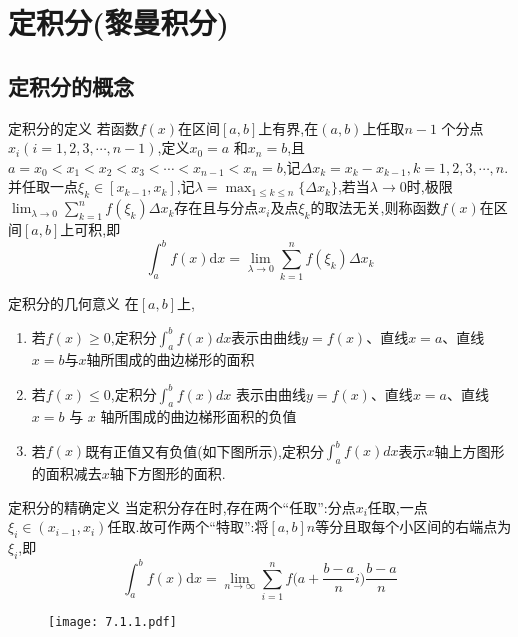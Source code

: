 \documentclass[8pt a4paper, oneside, UTF8]{ctexbook}  %
\begin{document}
\begin{sloppypar}
    \else
    \fi
    \chapter{定积分(黎曼积分)}
    \section{定积分的概念}
    \begin{defn}{定积分的定义}{}
        若函数$f(x)$在区间$[a,b]$上有界,在$(a,b)$上任取$n-1$ 个分点$x_i(i=1,2,3,\cdots,n-1)$,定义$x_0=a$ 和$x_n=b$,且$a=x_0<x_1<x_2<x_3<\cdots<x_{n-1}<x_n=b$,记$\Delta x_k=x_k-x_{k-1},k=1,2,3,\cdots,n$.并任取一点$\xi_{k}\in[x_{k-1},x_{k}]$,记$\lambda=\max_{1\leq k \leq n}\{\Delta x_{k}\}$,若当$\lambda\to0$时,极限$\lim_{\lambda\to0}\sum_{k=1}^{n}f(\xi_{k})\Delta x_{k}$存在且与分点$x_i$及点$\xi_k$的取法无关,则称函数$f(x)$在区间$[a,b]$上可积,即
        $$
            \int_{a}^{b}f(x)\mathrm{d}x=\lim_{\lambda\to0}\sum_{k=1}^{n}f\left(\xi_{k}\right)\Delta x_{k}
        $$
    \end{defn}
    \begin{criterion}{定积分的几何意义}{}
        在$[a,b]$上,
        \begin{enumerate}
            \item 若$f(x)\geqslant0$,定积分$\int_a^bf(x) d x$表示由曲线$y=f(x)$、直线$x=a$、直线$x=b$与$x$轴所围成的曲边梯形的面积
            \item 若$f(x)\leqslant0$,定积分$\int_a^bf(x) d x$ 表示由曲线$y=f(x)$、直线$x=a$、直线 $x=b$ 与 $x$ 轴所围成的曲边梯形面积的负值
            \item 若$f(x)$既有正值又有负值(如下图所示),定积分$\int_a^bf(x) dx$表示$x$轴上方图形的面积减去$x$轴下方图形的面积.
        \end{enumerate}
    \end{criterion}
    \begin{defn}{定积分的精确定义}{}
        当定积分存在时,存在两个“任取”:分点$x_i$任取,一点$\xi_i\in(x_{i-1},x_i)$任取.故可作两个“特取”:将$[a,b]n$等分且取每个小区间的右端点为$\xi_i$,即
        $$
            \int_{a}^{b}f(x)\mathrm{d}x=\lim_{n\to\infty}\sum_{i=1}^{n}f\Bigg(a+\dfrac{b-a}{n}i\Bigg)\frac{b-a}{n}
        $$
        \begin{figure}[H]
            \centering
            \texttt{[image: 7.1.1.pdf]}
        \end{figure}

\end{defn}
\end{sloppypar}
\end{document}
